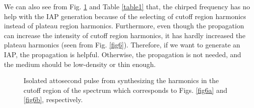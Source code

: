 \documentclass[10pt,letterpaper]{article}
\begin{document}
We can also see from Fig. \ref{fig7} and Table \ref{table1} that, the chirped frequency has no help with the IAP generation because of the selecting of cutoff region harmonics instead of plateau region harmonics. Furthermore, even though the propagation can increase the intensity of cutoff region harmonics, it has hardly increased the plateau harmonics (seen from Fig. \ref{fig6}). Therefore, if we want to generate an IAP, the propagation is helpful. Otherwise, the propagation is not needed, and the medium should be low-density or thin enough. 
\begin{figure}[htb]
	\centering
	\hspace{-0.2in}
	\caption{Isolated attosecond pulse from synthesizing the harmonics in the cutoff region of the spectrum which corresponds to Figs. \ref{fig6a} and \ref{fig6b}, respectively.}
	\label{fig7}
\end{figure}
\end{document}

